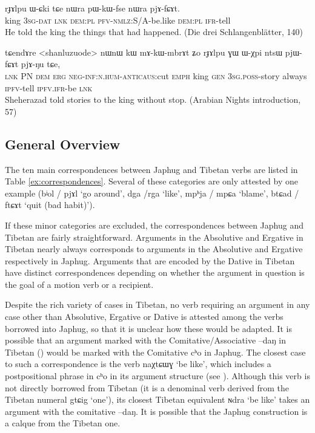 \documentclass[oldfontcommands,oneside,a4paper,11pt]{article}
\newcommand{\ipa}[1]{{\phon \mbox{#1}}} %
\begin{document}
\begin{exe}
\ex \label{ex:pjAfCAt}
\gll
  \ipa{rɟɤlpu} 	\ipa{ɯ-ɕki} 	\ipa{tɕe} 	\ipa{nɯra} 	\ipa{pɯ-kɯ-fse} 	\ipa{nɯra} 	\ipa{pjɤ-fɕɤt.} \\
  king \textsc{3sg-dat} \textsc{lnk} \textsc{dem:pl} \textsc{pfv-nmlz}:S/A-be.like  \textsc{dem:pl} \textsc{ifr}-tell \\
  \glt He told the king the things that had happened. (Die drei Schlangenblätter, 140)
\end{exe}

\begin{exe}
\ex \label{ex:pjWfCAt}
\gll
  \ipa{tɕendɤre} 	<shanluzuode> 	\ipa{nɯnɯ} 	\ipa{kɯ} 	\ipa{mɤ-kɯ-mbrɤt} 	\ipa{ʑo} 	\ipa{rɟɤlpu} 	\ipa{ɣɯ} 	\ipa{ɯ-χpi} 	\ipa{ntsɯ} 	\ipa{pjɯ-fɕɤt} 	\ipa{pjɤ-ŋu} 	\ipa{tɕe,} \\
  \textsc{lnk} PN \textsc{dem} \textsc{erg} \textsc{neg-inf:n.hum}-\textsc{anticaus}:cut \textsc{emph} king \textsc{gen} \textsc{3sg.poss}-story always \textsc{ipfv}-tell \textsc{ipfv.ifr}-be \textsc{lnk} \\
\glt Sheherazad told stories to the king without stop. (Arabian Nights introduction, 57)
\end{exe}


\subsection{General Overview}
The ten main correspondences between Japhug and Tibetan verbs are listed in Table \ref{ex:correspondences}. Several of these categories are only attested by one example (\ipa{bʲol} / \ipa{pjɤl} `go around', \ipa{dga} /\ipa{rga} `like', \ipa{mpʰja} / \ipa{mpɕa} `blame', \ipa{btɕad} / \ipa{ftɕɤt} `quit (bad habit)'). 

If these minor categories are excluded, the correspondences between Japhug and Tibetan are fairly straightforward. Arguments in the Absolutive and Ergative in Tibetan nearly always corresponds to arguments in the Absolutive and Ergative respectively in Japhug. Arguments that are encoded by the Dative in Tibetan have distinct correspondences depending on whether the argument in question is the goal of a motion verb or a recipient.

Despite the rich variety of cases in Tibetan, no verb requiring an argument in any case other than Absolutive, Ergative or Dative is attested among the verbs borrowed into Japhug, so that it is unclear how these would be adapted. It is possible that an argument marked with the Comitative/Associative \ipa{--daŋ} in Tibetan (\citealt{tournadre10cases, hill12bas}) would be marked with the Comitative \ipa{cʰo} in Japhug. The closest case to such a correspondence is the verb \ipa{naχtɕɯɣ} `be like', which includes a postpositional phrase in \ipa{cʰo} in its argument structure (see \citealt[273]{jacques14linking}). Although this verb is not directly borrowed from Tibetan (it is a denominal verb derived from the Tibetan numeral \ipa{gtɕig} `one'), its closest Tibetan equivalent \ipa{ɴdra} `be like' takes an argument with the comitative \ipa{--daŋ}. It is possible that the Japhug construction is a calque from the Tibetan one.
\end{document}
